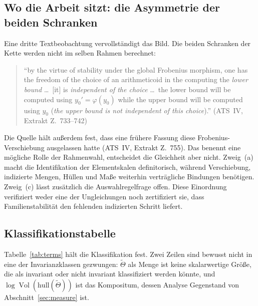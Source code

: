 \documentclass[11pt,a4paper]{article}
\theoremstyle{definition}
\theoremstyle{plain}
\theoremstyle{definition}
\newcommand{\Vol}{\operatorname{Vol}}
\newcommand{\Thet}{\widetilde{\Theta}}
\newcommand{\anchor}[2]{(#1, Extrakt Z.~#2)}
\begin{document}
\subsection{Wo die Arbeit sitzt: die Asymmetrie der beiden Schranken}

Eine dritte Textbeobachtung vervollständigt das Bild. Die beiden Schranken der Kette
werden nicht im selben Rahmen berechnet:

\begin{quote}\small
``by the virtue of stability under the global Frobenius morphism, one has the
freedom of the choice of an arithmeticoid in the computing the \emph{lower bound}
\ldots\ [it] is \emph{independent of the choice} \ldots\ the lower bound will be
computed using $y_0' = \varphi(y_0)$ while the upper bound will be computed using
$y_0$ (\emph{the upper bound is not independent of this choice}).''
\hfill\anchor{ATS~IV}{733--742}
\end{quote}

Die Quelle hält außerdem fest, dass eine frühere Fassung diese
Frobenius-Verschiebung ausgelassen hatte \anchor{ATS~IV}{755}.
Das benennt eine mögliche Rolle der Rahmenwahl, entscheidet die Gleichheit
aber nicht. Zweig~(a) macht die Identifikation der Elementskalen definitorisch,
während Verschiebung, indizierte Mengen, Hüllen und Maße weiterhin
verträgliche Bindungen benötigen. Zweig~(c) lässt zusätzlich die
Auswahlregelfrage offen. Diese Einordnung verifiziert weder eine der
Ungleichungen noch zertifiziert sie, dass Familienstabilität den fehlenden
indizierten Schritt liefert.

\subsection{Klassifikationstabelle}

Tabelle~\ref{tab:terms} hält die Klassifikation fest. Zwei Zeilen sind bewusst nicht
in eine der Invarianzklassen gezwungen: $\Thet$ als Menge ist keine skalarwertige
Größe, die als invariant oder nicht invariant klassifiziert werden könnte, und
$\log \Vol(\mathrm{hull}(\Thet))$ ist das Kompositum, dessen Analyse Gegenstand von
Abschnitt~\ref{sec:measure} ist.
\end{document}
